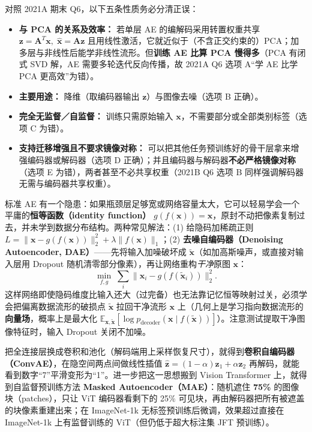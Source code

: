 对照 2021A 期末 Q6，以下五条性质务必分清正误：
\begin{itemize}
\item \textbf{与 PCA 的关系及效率：} 若单层 AE 的编解码采用转置权重共享 $\mathbf{z}=\mathbf{A}^T\mathbf{x},\;\hat{\mathbf{x}}=\mathbf{A}\mathbf{z}$ 且用线性激活，它就近似于（不含正交约束的）PCA；加多层与非线性后能学非线性流形。但\textbf{训练 AE 比算 PCA 慢得多}（PCA 有闭式 SVD 解，AE 需要多轮迭代反向传播，故 2021A Q6 选项 A“学 AE 比学 PCA 更高效”为错）。
\item \textbf{主要用途：} 降维（取编码器输出 $\mathbf{z}$）与图像去噪（选项 B 正确）。
\item \textbf{完全无监督／自监督：} 训练只需原始输入 $\mathbf{x}$，不需要部分或全部类别标签（选项 C 为错）。
\item \textbf{支持迁移增强且不要求镜像对称：} 可以把其他任务预训练好的骨干层拿来增强编码器或解码器（选项 D 正确）；并且编码器与解码器\textbf{不必严格镜像对称}（选项 E 为错），两者甚至不必共享权重（2021B Q6 选项 B 同样强调解码器无需与编码器共享权重）。
\end{itemize}


标准 AE 有一个隐患：如果瓶颈层足够宽或网络容量太大，它可以轻易学会一个平庸的\textbf{恒等函数（identity function）} $g(f(\mathbf{x}))=\mathbf{x}$，原封不动把像素复制过去，并未学到数据分布结构。两种常见解法：(1) 给隐码加稀疏正则 $L=\|\mathbf{x}-g(f(\mathbf{x}))\|_2^2 + \lambda\|f(\mathbf{x})\|_1$；(2) \textbf{去噪自编码器（Denoising Autoencoder, DAE）}——先将输入加噪破坏成 $\tilde{\mathbf{x}}$（如加高斯噪声，或直接对输入层用 Dropout 随机清零部分像素），再让网络重构\emph{干净}原图 $\mathbf{x}$：
\[
\min_{f,g}\;\sum_i \|\mathbf{x}_i - g(f(\tilde{\mathbf{x}}_i))\|_2^2.
\tag{10.1}
\]
这样网络即使隐码维度比输入还大（过完备）也无法靠记忆恒等映射过关，必须学会把偏离数据流形的破损点 $\tilde{\mathbf{x}}$ 拉回干净流形 $\mathbf{x}$ 上（几何上是学习指向数据流形的\textbf{向量场}，概率上是最大化 $\mathbb{E}_{\mathbf{x},\tilde{\mathbf{x}}}[\log p_{\text{decoder}}(\mathbf{x}\mid f(\tilde{\mathbf{x}}))]$）。注意测试提取干净图像特征时，输入 Dropout 关闭不加噪。

把全连接层换成卷积和池化（解码端用上采样恢复尺寸），就得到\textbf{卷积自编码器（ConvAE）}，在隐空间两点间做线性插值 $\hat{\mathbf{z}}=(1-\alpha)\mathbf{z}_1+\alpha\mathbf{z}_2$ 再解码，就能看到数字“7”平滑变形为“1”。进一步把这一思想搬到 Vision Transformer 上，就得到自监督预训练方法 \textbf{Masked Autoencoder（MAE）}：随机遮住 \textbf{75\%} 的图像块（patches），只让 ViT 编码器看剩下的 25\% 可见块，再由解码器把所有被遮盖的块像素重建出来；在 ImageNet-1k 无标签预训练后微调，效果超过直接在 ImageNet-1k 上有监督训练的 ViT（但仍低于超大标注集 JFT 预训练）。

